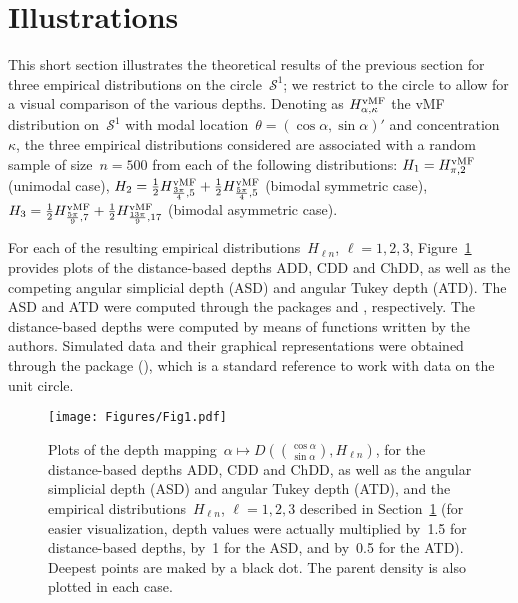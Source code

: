 \documentclass[usenames,dvipsnames]{article}
\begin{document}

\section{Illustrations}
\label{secillu}

This short section illustrates the theoretical results of the previous section for three empirical distributions on the circle~$\mathcal{S}^1$; we restrict to the circle to allow for a visual comparison of the various depths. Denoting as $H^{\rm vMF}_{\alpha,\kappa}$ the vMF distribution on~$\mathcal{S}^1$ with modal location~$\theta=(\cos\alpha,\sin\alpha)'$ and concentration~$\kappa$, the three empirical distributions considered are associated with a random sample of size~$n=500$ from each of the following distributions:
%
$H_1=H^{\rm vMF}_{\pi,2}$ (unimodal case),
%
$H_2=\frac{1}{2} H^{\rm vMF}_{\frac{3\pi}{4},5}+\frac{1}{2} H^{\rm vMF}_{\frac{5\pi}{4},5}$ (bimodal symmetric case), 
$H_3=\frac{1}{2} H^{\rm vMF}_{\frac{5\pi}{9},7}+\frac{1}{2} H^{\rm vMF}_{\frac{13\pi}{9},17}$ (bimodal asymmetric case).

For each of the resulting empirical distributions~$H_{\ell n}$, $\ell=1,2,3$,   Figure~\ref{Figillu} provides plots of the distance-based depths ADD, CDD and ChDD, as well as the competing angular simplicial depth (ASD) and angular Tukey depth (ATD). The ASD and ATD were computed through the packages {} and {}, respectively. The distance-based depths were computed by means of {} functions written by the authors. Simulated data and their graphical representations were obtained through the {} package {} (\citealp{LunAgo2013}), which is a standard reference to work with data on the unit circle. 

\begin{figure}[h!]
\captionsetup{font=scriptsize}
\begin{center}
\texttt{[image: Figures/Fig1.pdf]}
\end{center}
\vspace{-5mm}
\caption{Plots of the depth mapping~$\alpha\mapsto D({\cos \alpha \choose \sin  \alpha},H_{\ell n})$, for the distance-based depths ADD, CDD and ChDD,
as well as the angular simplicial depth (ASD) and angular Tukey depth (ATD),
%
 and the empirical distributions~$H_{\ell n}$, $\ell=1,2,3$ described in Section~\ref{secillu} (for easier visualization, depth values were actually multiplied by~1.5 for distance-based depths, by~1 for the ASD, and by~0.5 for the ATD). Deepest points are maked by a black dot. The parent density is also plotted in each case. 
}
\label{Figillu}
\end{figure}
\end{document}
